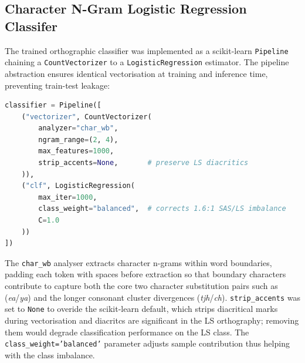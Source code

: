 \documentclass[11pt,a4paper]{article}
\begin{document}
\subsection{Character N-Gram Logistic Regression Classifer}

The trained orthographic classifier was implemented as a scikit-learn \texttt{Pipeline} chaining a \texttt{CountVectorizer} to a \texttt{LogisticRegression} estimator. The pipeline abstraction ensures identical vectorisation at training and inference time, preventing train-test leakage:

\begin{lstlisting}[language=Python, caption={Character n-gram logistic regression pipeline.}, label={lst:classifier}]
classifier = Pipeline([
    ("vectorizer", CountVectorizer(
        analyzer="char_wb",
        ngram_range=(2, 4),
        max_features=1000,
        strip_accents=None,       # preserve LS diacritics
    )),
    ("clf", LogisticRegression(
        max_iter=1000,
        class_weight="balanced",  # corrects 1.6:1 SAS/LS imbalance
        C=1.0
    ))
])
\end{lstlisting}

The \texttt{char\_wb} analyser extracts character n-grams within word boundaries, padding each token with spaces before extraction so that boundary characters contribute to capture both the core two character substitution pairs such as (\textit{ea}/\textit{ya}) and the longer consonant cluster divergences (\textit{tjh}/\textit{ch}). \texttt{strip\_accents} was set to \texttt{None} to overide the scikit-learn default, which strips diacritical marks during vectorisation and diacritcs are significant in the LS orthography; removing them would degrade classification performance on the LS class. The \texttt{class\_weight='balanced'} parameter adjusts sample contribution thus helping with the class imbalance.










  
\end{document}
